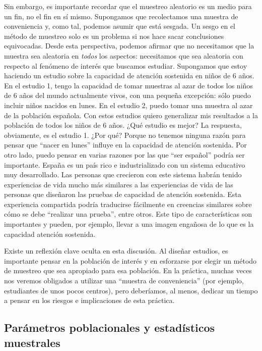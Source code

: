 \documentclass[spanish,]{book}
\begin{document}
Sin embargo, es importante recordar que el muestreo aleatorio es un
medio para un fin, no el fin en sí mismo. Supongamos que recolectamos
una muestra de conveniencia y, como tal, podemos asumir que está
sesgada. Un sesgo en el método de muestreo solo es un problema si nos
hace sacar conclusiones equivocadas. Desde esta perspectiva, podemos
afirmar que no necesitamos que la muestra sea aleatoria en \emph{todos}
los aspectos: necesitamos que sea aleatoria con respecto al fenómeno de
interés que buscamos estudiar. Supongamos que estoy haciendo un estudio
sobre la capacidad de atención sostenida en niños de 6 años. En el
estudio 1, tengo la capacidad de tomar muestras al azar de todos los
niños de 6 años del mundo actualmente vivos, con una pequeña excepción:
sólo puedo incluir niños nacidos en lunes. En el estudio 2, puedo tomar
una muestra al azar de la población española. Con estos estudios quiero
generalizar mis resultados a la población de todos los niños de 6 años.
¿Qué estudio es mejor? La respuesta, obviamente, es el estudio 1. ¿Por
qué? Porque no tenemos ninguna razón para pensar que ``nacer en lunes''
influye en la capacidad de atención sostenida. Por otro lado, puedo
pensar en varias razones por las que ``ser español'' podría ser
importante. España es un país rico e industrializado con un sistema
educativo muy desarrollado. Las personas que crecieron con este sistema
habrán tenido experiencias de vida mucho más similares a las
experiencias de vida de las personas que diseñaron las pruebas de
capacidad de atención sostenida. Esta experiencia compartida podría
traducirse fácilmente en creencias similares sobre cómo se debe
``realizar una prueba'', entre otros. Este tipo de características son
importantes y pueden, por ejemplo, llevar a una imagen engañosa de lo
que es la capacidad atención sostenida.

Existe un reflexión clave oculta en esta discusión. Al diseñar estudios,
es importante pensar en la población de interés y en esforzarse por
elegir un método de muestreo que sea apropiado para esa población. En la
práctica, muchas veces nos veremos obligados a utilizar una ``muestra de
conveniencia'' (por ejemplo, estudiantes de unos pocos centros), pero
deberíamos, al menos, dedicar un tiempo a pensar en los riesgos e
implicaciones de esta práctica.

\subsection{Parámetros poblacionales y estadísticos
muestrales}\label{parametros-poblacionales-y-estadisticos-muestrales}
\end{document}
